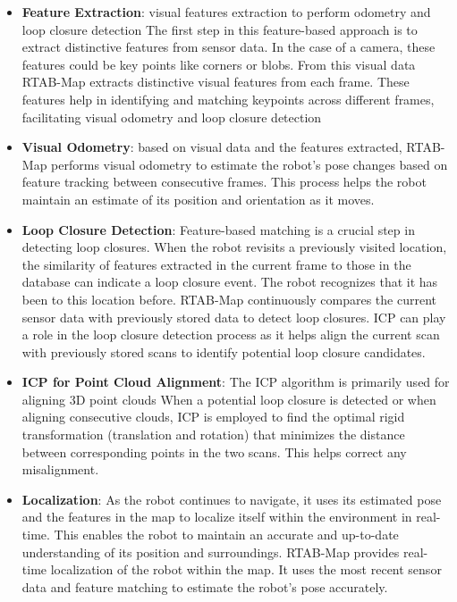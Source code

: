 \begin{itemize}
    \item \textbf{Feature Extraction}: visual features extraction to perform odometry and loop closure detection
    The first step in this feature-based approach is to extract distinctive features from sensor data. In the case of a camera, these features could be key points like corners or blobs. From this visual data RTAB-Map extracts distinctive visual features from each frame. These features help in identifying and matching keypoints across different frames, facilitating visual odometry and loop closure detection
    
    \item \textbf{Visual Odometry}: based on visual data and the features extracted, RTAB-Map performs visual odometry to estimate the robot's pose changes based on feature tracking between consecutive frames. This process helps the robot maintain an estimate of its position and orientation as it moves.
    
    \item \textbf{Loop Closure Detection}: Feature-based matching is a crucial step in detecting loop closures. When the robot revisits a previously visited location, the similarity of features extracted in the current frame to those in the database can indicate a loop closure event. The robot recognizes that it has been to this location before. RTAB-Map continuously compares the current sensor data with previously stored data to detect loop closures. ICP can play a role in the loop closure detection process as it helps align the current scan with previously stored scans to identify potential loop closure candidates.


    
    \item \textbf{ICP for Point Cloud Alignment}: The ICP algorithm is primarily used for aligning 3D point clouds When a potential loop closure is detected or when aligning consecutive clouds, ICP is employed to find the optimal rigid transformation (translation and rotation) that minimizes the distance between corresponding points in the two scans. This helps correct any misalignment.
    
    \item \textbf{Localization}: As the robot continues to navigate, it uses its estimated pose and the features in the map to localize itself within the environment in real-time. This enables the robot to maintain an accurate and up-to-date understanding of its position and surroundings. RTAB-Map provides real-time localization of the robot within the map. It uses the most recent sensor data and feature matching to estimate the robot's pose accurately.
    
\end{itemize}

